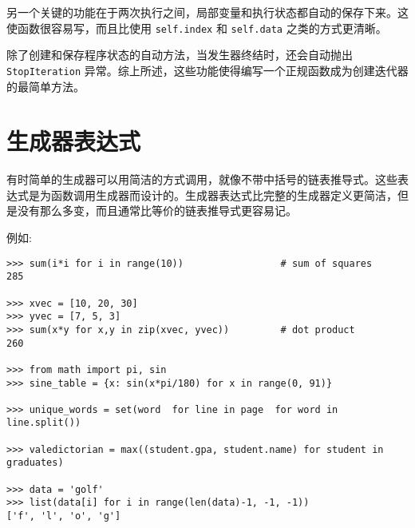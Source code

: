 另一个关键的功能在于两次执行之间，局部变量和执行状态都自动的保存下来。这使函数很容易写，而且比使用 \texttt{self.index} 和 \texttt{self.data} 之类的方式更清晰。

除了创建和保存程序状态的自动方法，当发生器终结时，还会自动抛出 \texttt{StopIteration} 异常。综上所述，这些功能使得编写一个正规函数成为创建迭代器的最简单方法。
\section{生成器表达式}
有时简单的生成器可以用简洁的方式调用，就像不带中括号的链表推导式。这些表达式是为函数调用生成器而设计的。生成器表达式比完整的生成器定义更简洁，但是没有那么多变，而且通常比等价的链表推导式更容易记。

例如:
\begin{lstlisting}
>>> sum(i*i for i in range(10))                 # sum of squares
285

>>> xvec = [10, 20, 30]
>>> yvec = [7, 5, 3]
>>> sum(x*y for x,y in zip(xvec, yvec))         # dot product
260

>>> from math import pi, sin
>>> sine_table = {x: sin(x*pi/180) for x in range(0, 91)}

>>> unique_words = set(word  for line in page  for word in line.split())

>>> valedictorian = max((student.gpa, student.name) for student in graduates)

>>> data = 'golf'
>>> list(data[i] for i in range(len(data)-1, -1, -1))
['f', 'l', 'o', 'g']
\end{lstlisting} 